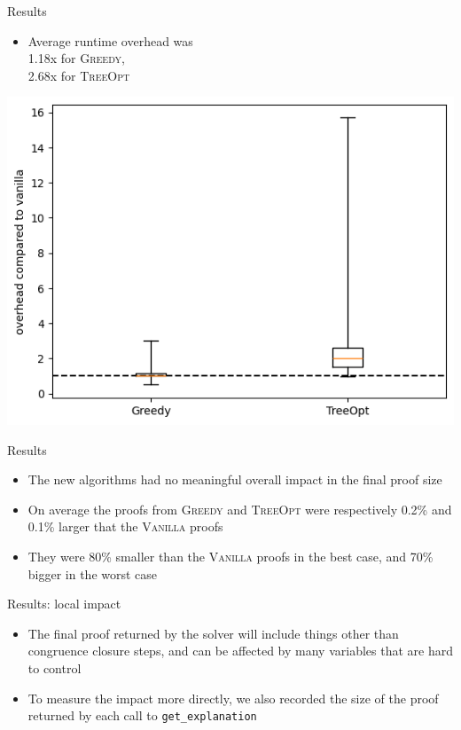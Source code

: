 \documentclass[aspectratio=169]{beamer}
\newcommand\vitem{\vfill\item}
\begin{document}
\begin{frame}{Results}
  \begin{minipage}[c][0.5 \textheight]{0.3 \textwidth}
  \begin{itemize}
    \item Average runtime overhead was\\1.18x for \textsc{Greedy},\\2.68x
    for \textsc{TreeOpt}
  \end{itemize}
  \end{minipage}
  \hfill
  \begin{minipage}{0.68 \textwidth}
  \centerline{\includegraphics[width=\textwidth]{images/runtime-boxplot.png}}
  \end{minipage}
\end{frame}

\begin{frame}{Results}
  \begin{itemize}
    \item The new algorithms had no meaningful overall impact in the final proof
    size
    \vitem On average the proofs from \textsc{Greedy} and \textsc{TreeOpt} were
    respectively 0.2\% and 0.1\% larger that the \textsc{Vanilla} proofs
    \vitem They were 80\% smaller than the \textsc{Vanilla} proofs in the best
    case, and 70\% bigger in the worst case
  \end{itemize}
\end{frame}

\begin{frame}{Results: local impact}
  \begin{itemize}
    \item The final proof returned by the solver will include things other than
    congruence closure steps, and can be affected by many variables that are hard
    to control
    \vitem To measure the impact more directly, we also recorded the size of the
    proof returned by each call to \texttt{get\_explanation}
  \end{itemize}
\end{frame}
\end{document}
